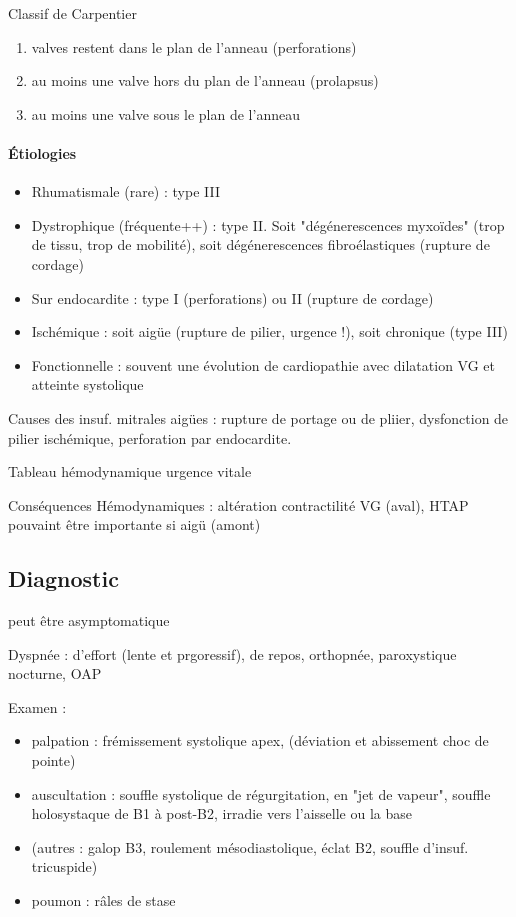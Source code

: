 Classif de Carpentier
\begin{enumerate}
  \item valves restent dans le plan de l'anneau (perforations)
  \item au moins une valve hors du plan de l'anneau (prolapsus)
  \item au moins une valve sous le plan de l'anneau
\end{enumerate}

\paragraph{Étiologies}
\begin{itemize}
  \item Rhumatismale (rare) : type III
  \item Dystrophique (fréquente++) : type II. Soit "dégénerescences myxoïdes"
    (trop de tissu, trop de mobilité), soit dégénerescences fibroélastiques
    (rupture de cordage)
  \item Sur endocardite : type I (perforations) ou II (rupture de cordage)
  \item Ischémique : soit aigüe (rupture de pilier, urgence \skull !), soit
    chronique (type III)
  \item Fonctionnelle : souvent une évolution de cardiopathie avec dilatation VG
    et atteinte systolique
\end{itemize}

Causes des insuf. mitrales aigües : rupture de portage ou de pliier, dysfonction
de pilier ischémique, perforation par endocardite.

Tableau hémodynamique \thus urgence vitale \danger 

Conséquences Hémodynamiques : altération contractilité VG (aval), HTAP pouvaint
être importante si aigü (amont)

\subsection{Diagnostic}
\danger{} peut être asymptomatique

Dyspnée : d'effort (lente et prgoressif), de repos, orthopnée, paroxystique
nocturne, OAP

Examen : 
\begin{itemize}
  \item palpation : frémissement systolique apex, (déviation et abissement choc
    de pointe)
  \item auscultation : souffle systolique de régurgitation, en "jet de vapeur",
    souffle holosystaque de B1 à post-B2, irradie vers l'aisselle ou la base
  \item (autres : galop B3, roulement mésodiastolique, éclat B2, souffle
    d'insuf. tricuspide)
  \item poumon : râles de stase
\end{itemize}


